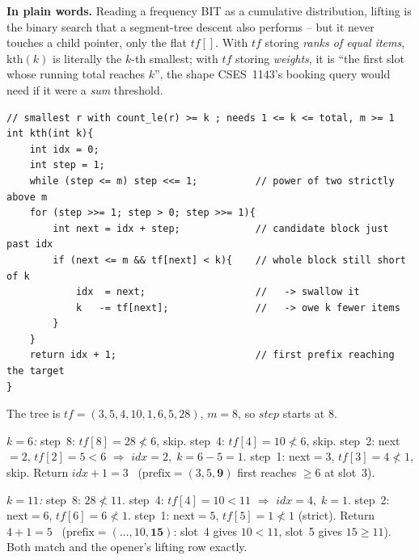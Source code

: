 \noindent\textbf{In plain words.}  Reading a frequency BIT as a cumulative
distribution, lifting is the binary search that a segment-tree descent also
performs -- but it never touches a child pointer, only the flat
\(\mathit{tf}[]\).  With \(\mathit{tf}\) storing \emph{ranks of equal items},
\(\text{kth}(k)\) is literally the \(k\)-th smallest; with \(\mathit{tf}\)
storing \emph{weights}, it is ``the first slot whose running total reaches
\(k\)'', the shape CSES~1143's booking query would need if it were a
\emph{sum} threshold.

\begin{lstlisting}[caption={binary lifting on the BIT: smallest index whose prefix sum reaches k}, label={lst:c14-kth}]
// smallest r with count_le(r) >= k ; needs 1 <= k <= total, m >= 1
int kth(int k){
    int idx = 0;
    int step = 1;
    while (step <= m) step <<= 1;          // power of two strictly above m
    for (step >>= 1; step > 0; step >>= 1){
        int next = idx + step;             // candidate block just past idx
        if (next <= m && tf[next] < k){    // whole block still short of k
            idx  = next;                   //   -> swallow it
            k   -= tf[next];               //   -> owe k fewer items
        }
    }
    return idx + 1;                        // first prefix reaching the target
}
\end{lstlisting}

\begin{tracebox}[Lifting on w=(3,2,4,1,5,5,2,6): kth(6) and kth(11)]
The tree is \(\mathit{tf}=(3,5,4,10,1,6,5,28)\), \(m=8\), so
\(\mathit{step}\) starts at \(8\).

\emph{\(k=6\):} step~8: \(\mathit{tf}[8]=28\not<6\), skip. step~4:
\(\mathit{tf}[4]=10\not<6\), skip. step~2: next\(=2\),
\(\mathit{tf}[2]=5<6\) \(\Rightarrow\) \(\mathit{idx}=2,\;k=6-5=1\). step~1:
next\(=3\), \(\mathit{tf}[3]=4\not<1\), skip. Return \(\mathit{idx}+1=3\)
\checkmark\ (\(\text{prefix}=(3,5,\mathbf{9})\) first reaches \(\ge6\) at
slot~3).

\emph{\(k=11\):} step~8: \(28\not<11\). step~4: \(\mathit{tf}[4]=10<11\)
\(\Rightarrow\) \(\mathit{idx}=4,\;k=1\). step~2: next\(=6\),
\(\mathit{tf}[6]=6\not<1\). step~1: next\(=5\), \(\mathit{tf}[5]=1\not<1\)
(strict). Return \(4+1=5\) \checkmark\ (\(\text{prefix}=(\ldots,10,\mathbf{15})\):
slot~4 gives \(10<11\), slot~5 gives \(15\ge11\)).  Both match
 and the opener's lifting row exactly.
\end{tracebox}

